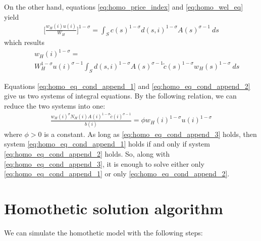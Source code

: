 \documentclass{article}
\begin{document}
On the other hand, equations \eqref{eq:homo_price_index} and \eqref{eq:homo_wel_eq} yield
\begin{eqnarray}
	\Big[ \frac{w_H(i) u(i)}{W_H } \Big]^{1-\sigma} = \int_S c(s)^{1-\sigma}d(s,i)^{1-\sigma}A(s)^{\sigma-1}~ ds \nonumber
\end{eqnarray}
which results
\begin{eqnarray}
    \label{eq:homo_eq_cond_append_2}
 	& & w_H(i)^{1-\sigma} = \nonumber \\ 
 	& & 
 	W_H^{1-\sigma} u(i)^{\sigma-1} 
 	\int_S  d(s,i)^{1-\sigma} A(s)^{\sigma-1}  \tilde{c}(s)^{1-\sigma} w_H(s)^{1-\sigma}
 	~ ds 
\end{eqnarray}

Equations \eqref{eq:homo_eq_cond_append_1} and \eqref{eq:homo_eq_cond_append_2} give us two systems of integral equations. By the following relation, we can reduce the two systems into one: 
\begin{eqnarray}
    \label{eq:homo_eq_cond_append_3}
	\frac{w_H(i)^{\sigma}N_H(i)A(i)^{1-\sigma}\tilde{c}(i)^{\sigma-1}}{b(i)} = \phi w_H(i)^{1-\sigma} u(i)^{1-\sigma}
\end{eqnarray}
where $\phi > 0$ is a constant. As long as \eqref{eq:homo_eq_cond_append_3} holds, then system \eqref{eq:homo_eq_cond_append_1} holds if and only if system \eqref{eq:homo_eq_cond_append_2} holds. So, along with \eqref{eq:homo_eq_cond_append_3}, it is enough to solve either only \eqref{eq:homo_eq_cond_append_1} or only \eqref{eq:homo_eq_cond_append_2}.

\section{Homothetic solution algorithm}

We can simulate the homothetic model with the following steps:
\end{document}
